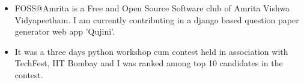 \documentclass[10pt,a4paper,ragged2e]{altacv}
\begin{document}

\begin{fullwidth}
\makecvheader
\end{fullwidth}



\begin{itemize}
\item FOSS@Amrita is a Free and Open Source Software club of Amrita Vishwa Vidyapeetham. I am currently contributing in a django based question paper generator web app 'Qujini'.

\end{itemize}

\divider

\begin{itemize}
\item It was a three days python workshop cum contest held in association with TechFest, IIT Bombay and I was ranked among top 10 candidates in the contest.

\end{itemize}
\end{document}
